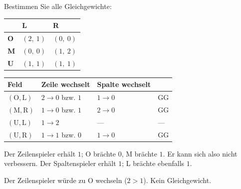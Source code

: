 \begin{aufgabe}
Bestimmen Sie alle Gleichgewichte:
\begin{center}
{\small
\renewcommand{\arraystretch}{1.6}
\begin{tabular}{@{}P{1.6cm}P{2.0cm}P{2.0cm}@{}}
\toprule
& \textbf{L} & \textbf{R}\\
\midrule
\textbf{O} & $(2,\ 1)$ & $(0,\ 0)$\\
\textbf{M} & $(0,\ 0)$ & $(1,\ 2)$\\
\textbf{U} & $(1,\ 1)$ & $(1,\ 1)$\\
\bottomrule
\end{tabular}}
\end{center}

\loesung
{}
\begin{center}
{\small
\renewcommand{\arraystretch}{1.48}
\begin{tabular}{@{}P{1.6cm}P{2.4cm}P{2.4cm}P{1.2cm}@{}}
\toprule
\textbf{Feld} & \textbf{Zeile wechselt} & \textbf{Spalte wechselt} & \\
\midrule
$(\text{O},\text{L})$ & $2\to0$ bzw. $1$ & $1\to0$ & \textcolor{gruen}{GG}\\
$(\text{M},\text{R})$ & $1\to0$ bzw. $1$ & $2\to0$ & \textcolor{gruen}{GG}\\
$(\text{U},\text{L})$ & $1\to2$ & --- & ---\\
$(\text{U},\text{R})$ & $1\to1$ bzw. $0$ & $1\to0$ & \textcolor{gruen}{GG}\\
\bottomrule
\end{tabular}}
\end{center}

 Der Zeilenspieler erhält $1$; O brächte $0$, M brächte $1$. Er kann sich also nicht verbessern. Der Spaltenspieler erhält $1$; L brächte ebenfalls $1$.

\begin{center}
\begin{minipage}{0.88\textwidth}
\end{minipage}
\end{center}

 Der Zeilenspieler würde zu O wechseln ($2>1$). Kein Gleichgewicht.


\end{aufgabe}
